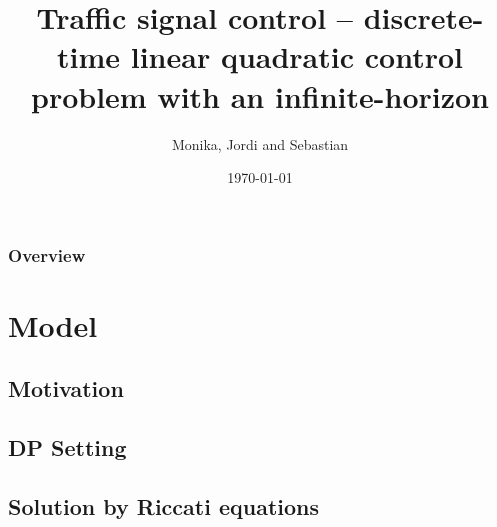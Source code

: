\documentclass{beamer}
\title[Traffic control]{Traffic signal control – discrete-time linear quadratic control problem with an infinite-horizon} %
\author{Monika, Jordi and Sebastian} %
\institute[BGSE] %
{
Barcelona Graduate School of Economics \\ %
\medskip
}
\date{\today} %
\begin{document}
\begin{frame}
\titlepage %
\end{frame}

\begin{frame}
\frametitle{Overview} %
\tableofcontents %
\end{frame}


\section{Model} %

\subsection{Motivation} %
\subsection{DP Setting} %
\subsection{Solution by Riccati equations} %
\end{document}
